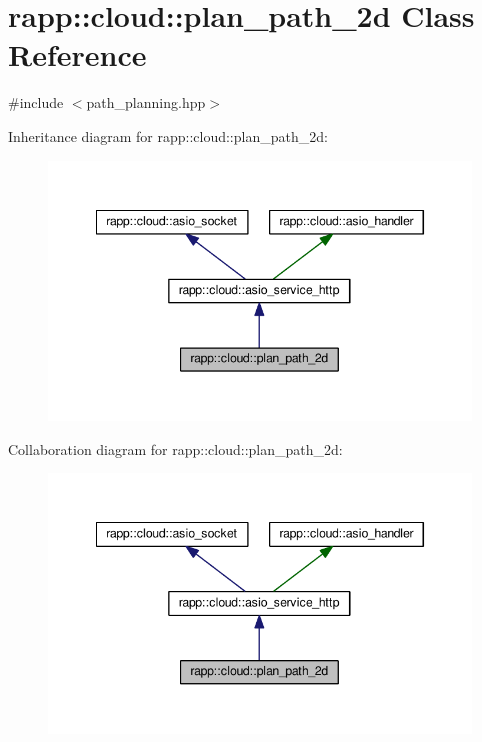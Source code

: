 \hypertarget{classrapp_1_1cloud_1_1plan__path__2d}{\section{rapp\-:\-:cloud\-:\-:plan\-\_\-path\-\_\-2d Class Reference}
\label{classrapp_1_1cloud_1_1plan__path__2d}
}


{\ttfamily \#include $<$path\-\_\-planning.\-hpp$>$}



Inheritance diagram for rapp\-:\-:cloud\-:\-:plan\-\_\-path\-\_\-2d\-:
\nopagebreak
\begin{figure}[H]
\begin{center}
\leavevmode
\includegraphics[width=345pt]{classrapp_1_1cloud_1_1plan__path__2d__inherit__graph}
\end{center}
\end{figure}


Collaboration diagram for rapp\-:\-:cloud\-:\-:plan\-\_\-path\-\_\-2d\-:
\nopagebreak
\begin{figure}[H]
\begin{center}
\leavevmode
\includegraphics[width=345pt]{classrapp_1_1cloud_1_1plan__path__2d__coll__graph}
\end{center}
\end{figure}

